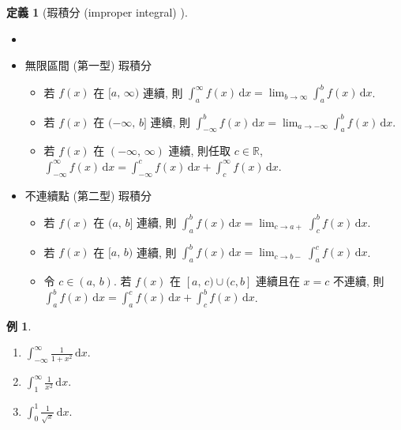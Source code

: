 \documentclass[12pt]{extarticle}
\newcommand{\ds}{\displaystyle}
\theoremstyle{definition}
\newtheorem*{dfn}{定義}
\newtheorem*{ex}{例}
\begin{document}
\begin{dfn}[瑕積分 (improper integral) ]
  \begin{itemize}\setlength{\itemsep}{0pt}
    \item[]
    \item 無限區間 (第一型) 瑕積分
      \begin{itemize}\setlength{\itemsep}{-1pt}
        \item 若 $f(x)$ 在 $\ds[a,\,\infty)$ 連續, 則 $\ds\int_a^\infty f(x)\,\text{d}x = \lim_{b\to\infty}\int_a^b f(x)\,\text{d}x$. 
        \item 若 $f(x)$ 在 $\ds(-\infty,\,b]$ 連續, 則 $\ds\int_{-\infty}^b f(x)\,\text{d}x = \lim_{a\to-\infty}\int_a^b f(x)\,\text{d}x$. 
        \item 若 $f(x)$ 在 $\ds(-\infty,\,\infty)$ 連續, 則任取 $c\in\mathbb{R}$, $\ds\int_{-\infty}^\infty f(x)\,\text{d}x = \int_{-\infty}^c f(x)\,\text{d}x + \int_c^{\infty} f(x)\,\text{d}x$. 
      \end{itemize}
    \item 不連續點 (第二型) 瑕積分
      \begin{itemize}\setlength{\itemsep}{-1pt}
        \item 若 $f(x)$ 在 $\ds(a,\,b]$ 連續, 則 $\ds\int_a^b f(x)\,\text{d}x = \lim_{c\to a+}\int_c^b f(x)\,\text{d}x$. 
        \item 若 $f(x)$ 在 $\ds[a,\,b)$ 連續, 則 $\ds\int_a^b f(x)\,\text{d}x = \lim_{c\to b-}\int_a^c f(x)\,\text{d}x$. 
        \item 令 $\ds c\in(a,\,b)$. 若 $f(x)$ 在 $\ds[a,\,c)\cup(c, b]$ 連續且在 $x = c$ 不連續, 則 $\ds\int_a^b f(x)\,\text{d}x = \int_{a}^c f(x)\,\text{d}x + \int_c^{b} f(x)\,\text{d}x$. 
      \end{itemize}
  \end{itemize}
\end{dfn}

\begin{ex} 
  \begin{multicols}{3}
    \begin{enumerate}\setlength{\itemsep}{0pt}
      \item $\ds\int_{-\infty}^{\infty}\!\frac{1}{1 + x^2}\,\text{d}x$. 
      \item $\ds\int_{1}^{\infty}\!\frac{1}{x^2}\,\text{d}x$.
      \item $\ds\int_0^1\!\frac{1}{\sqrt{x}}\,\text{d}x$. 
    \end{enumerate}
  \end{multicols}
\end{ex}
\end{document}
